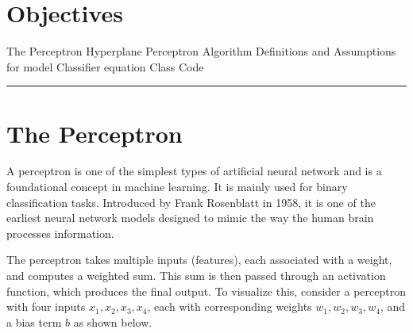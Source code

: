 \section*{Objectives}
\begin{outline}
    \1 The Perceptron 
    \1 Hyperplane
    \1 Perceptron Algorithm
    \1 Definitions and Assumptions for model
    \1 Classifier equation
    \1 Class Code
\end{outline}

\rule[0.0051in]{\textwidth}{0.00025in}

\section{The Perceptron}

A perceptron is one of the simplest types of artificial neural network and is a foundational concept in machine learning. 
It is mainly used for binary classification tasks. Introduced by Frank Rosenblatt in 1958, it is one of the earliest neural network models designed to mimic the way the human brain processes information.

The perceptron takes multiple inputs (features), each associated with a weight, and computes a weighted sum. 
This sum is then passed through an activation function, which produces the final output. 
To visualize this, consider a perceptron with four inputs \( x_1, x_2, x_3, x_4 \), each with corresponding weights \( w_1, w_2, w_3, w_4 \), and a bias term \( b \) as shown below.

